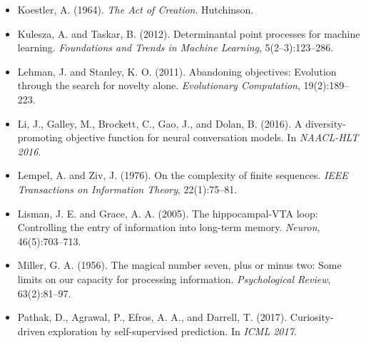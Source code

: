 \begin{itemize}
\item Koestler, A. (1964). \textit{The Act of Creation}. Hutchinson.
\end{itemize}

\begin{itemize}
\item Kulesza, A. and Taskar, B. (2012). Determinantal point processes for machine learning. \textit{Foundations and Trends in Machine Learning}, 5(2--3):123--286.
\end{itemize}

\begin{itemize}
\item Lehman, J. and Stanley, K. O. (2011). Abandoning objectives: Evolution through the search for novelty alone. \textit{Evolutionary Computation}, 19(2):189--223.
\end{itemize}

\begin{itemize}
\item Li, J., Galley, M., Brockett, C., Gao, J., and Dolan, B. (2016). A diversity-promoting objective function for neural conversation models. In \textit{NAACL-HLT 2016}.
\end{itemize}

\begin{itemize}
\item Lempel, A. and Ziv, J. (1976). On the complexity of finite sequences. \textit{IEEE Transactions on Information Theory}, 22(1):75--81.
\end{itemize}

\begin{itemize}
\item Lisman, J. E. and Grace, A. A. (2005). The hippocampal-VTA loop: Controlling the entry of information into long-term memory. \textit{Neuron}, 46(5):703--713.
\end{itemize}

\begin{itemize}
\item Miller, G. A. (1956). The magical number seven, plus or minus two: Some limits on our capacity for processing information. \textit{Psychological Review}, 63(2):81--97.
\end{itemize}

\begin{itemize}
\item Pathak, D., Agrawal, P., Efros, A. A., and Darrell, T. (2017). Curiosity-driven exploration by self-supervised prediction. In \textit{ICML 2017}.
\end{itemize}

